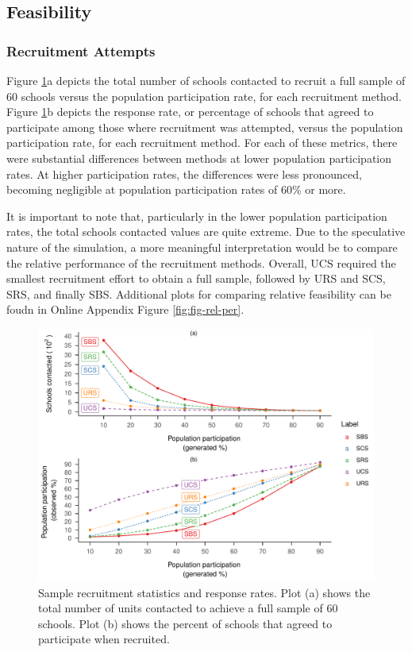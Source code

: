 \documentclass[english,man,floatsintext]{apa6}
\begin{document}
\hypertarget{feasibility-1}{%
\subsection{Feasibility}\label{feasibility-1}}

\hypertarget{recruitment-attempts}{%
\subsubsection{Recruitment Attempts}\label{recruitment-attempts}}

Figure \ref{fig:fig-responses}a depicts the total number of schools contacted to recruit a full sample of 60 schools versus the population participation rate, for each recruitment method. Figure \ref{fig:fig-responses}b depicts the response rate, or percentage of schools that agreed to participate among those where recruitment was attempted, versus the population participation rate, for each recruitment method. For each of these metrics, there were substantial differences between methods at lower population participation rates. At higher participation rates, the differences were less pronounced, becoming negligible at population participation rates of 60\% or more.

It is important to note that, particularly in the lower population participation rates, the total schools contacted values are quite extreme. Due to the speculative nature of the simulation, a more meaningful interpretation would be to compare the relative performance of the recruitment methods. Overall, UCS required the smallest recruitment effort to obtain a full sample, followed by URS and SCS, SRS, and finally SBS. Additional plots for comparing relative feasibility can be foudn in Online Appendix Figure \ref{fig:fig-rel-per}.



\begin{figure}
\centering
\includegraphics{6---Paper_files/figure-latex/fig-responses-1.pdf}
\caption{\label{fig:fig-responses}Sample recruitment statistics and response rates. Plot (a) shows the total number of units contacted to achieve a full sample of 60 schools. Plot (b) shows the percent of schools that agreed to participate when recruited.}
\end{figure}
\end{document}
